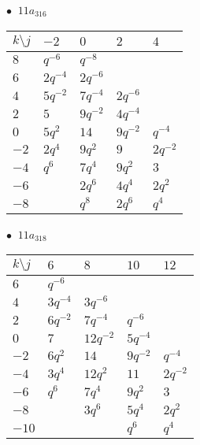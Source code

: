 \begin{minipage}{\linewidth}
$\bullet\ $ $11a_{316}$ \vspace{0.5em} \\
\begin{tabular}{l|llll}
$k \setminus j$ & $-2$ & $0$ & $2$ & $4$ \\
\hline
$8$ & $q^{-6}$ & $q^{-8}$ &  &  \\
$6$ & $2q^{-4}$ & $2q^{-6}$ &  &  \\
$4$ & $5q^{-2}$ & $7q^{-4}$ & $2q^{-6}$ &  \\
$2$ & $5$ & $9q^{-2}$ & $4q^{-4}$ &  \\
$0$ & $5q^{2}$ & $14$ & $9q^{-2}$ & $q^{-4}$ \\
$-2$ & $2q^{4}$ & $9q^{2}$ & $9$ & $2q^{-2}$ \\
$-4$ & $q^{6}$ & $7q^{4}$ & $9q^{2}$ & $3$ \\
$-6$ &  & $2q^{6}$ & $4q^{4}$ & $2q^{2}$ \\
$-8$ &  & $q^{8}$ & $2q^{6}$ & $q^{4}$ \\
\end{tabular}
\vspace{2em}
\end{minipage}
%
\begin{minipage}{\linewidth}
$\bullet\ $ $11a_{318}$ \vspace{0.5em} \\
\begin{tabular}{l|llll}
$k \setminus j$ & $6$ & $8$ & $10$ & $12$ \\
\hline
$6$ & $q^{-6}$ &  &  &  \\
$4$ & $3q^{-4}$ & $3q^{-6}$ &  &  \\
$2$ & $6q^{-2}$ & $7q^{-4}$ & $q^{-6}$ &  \\
$0$ & $7$ & $12q^{-2}$ & $5q^{-4}$ &  \\
$-2$ & $6q^{2}$ & $14$ & $9q^{-2}$ & $q^{-4}$ \\
$-4$ & $3q^{4}$ & $12q^{2}$ & $11$ & $2q^{-2}$ \\
$-6$ & $q^{6}$ & $7q^{4}$ & $9q^{2}$ & $3$ \\
$-8$ &  & $3q^{6}$ & $5q^{4}$ & $2q^{2}$ \\
$-10$ &  &  & $q^{6}$ & $q^{4}$ \\
\end{tabular}
\vspace{2em}
\end{minipage}
%
